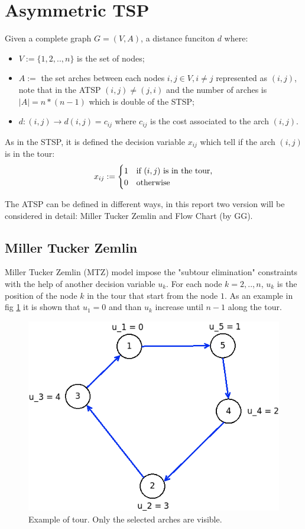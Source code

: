 \section{Asymmetric TSP}
Given a complete graph $ G = (V,A) $, a distance funciton  $ d $ where:
\begin{itemize}
	\item $ V:= \{1, 2, .., n\} $ is the set of nodes;
	\item $ A := $ the set arches between each nodes $ i,j \in V, i \ne j$ represented as $ (i,j) $, note that in the ATSP $ (i,j) \ne (j,i) $ and the number of arches is $ |A| = n*(n-1) $ which is double of the STSP;
	\item $ d: (i,j) \rightarrow d(i,j) = c_{ij} $ where $ c_{ij} $ is the cost associated to the arch $ (i,j) $.
\end{itemize}
As in the STSP, it is defined the decision variable $ x_{ij} $ which tell if the arch $ (i,j) $ is in the tour:
\[
x_{ij} := \begin{cases}
1 & \text{if $ (i,j) $ is in the tour,} \\
0 & \text{otherwise}
\end{cases}
\]

The ATSP can be defined in different ways, in this report two version will be considered in detail: Miller Tucker Zemlin and Flow Chart (by GG). %

\subsection{Miller Tucker Zemlin}
Miller Tucker Zemlin (MTZ) model impose the "subtour elimination" constraints with the help of another decision variable $ u_k $. For each node $ k = 2,..,n $, $ u_k $ is the position of the node $ k $ in the tour that start from the node $ 1 $. As an example in fig \ref{fig:asymTSP_MTZ} it is shown that $ u_1 = 0 $ and than $ u_k $ increase until $ n-1 $ along the tour.

\begin{figure}[h]
	\centering
	\includegraphics[width=.45\columnwidth]{img/asymTSP_MTZ_example.png}
	\caption{Example of tour. Only the selected arches are visible.}
	\label{fig:asymTSP_MTZ}
\end{figure}

